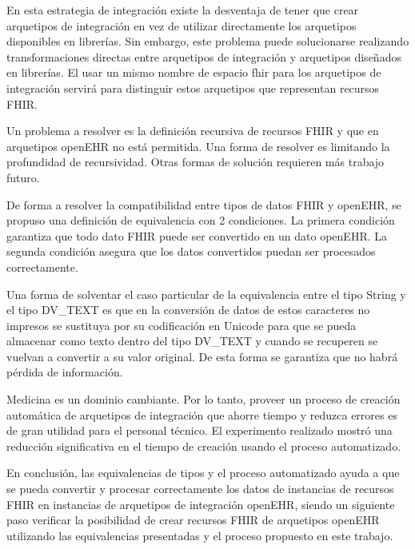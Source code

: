 En esta estrategia de integración existe la desventaja de tener que crear arquetipos de integración en vez de utilizar directamente los arquetipos disponibles en librerías. Sin embargo, este problema puede solucionarse realizando transformaciones directas entre arquetipos de integración y arquetipos diseñados en librerías. El usar un mismo nombre de espacio fhir para los arquetipos de integración servirá para distinguir estos arquetipos que representan recursos FHIR.

Un problema a resolver es la definición recursiva de recursos FHIR y que en arquetipos openEHR no está permitida. Una forma de resolver es limitando la profundidad de recursividad. Otras formas de solución requieren más trabajo futuro.

De forma a resolver la compatibilidad entre tipos de datos FHIR y openEHR, se propuso una definición de equivalencia con 2 condiciones. La primera condición garantiza que todo dato FHIR puede ser convertido en un dato openEHR. La segunda condición asegura que los datos convertidos puedan ser procesados correctamente.

Una forma de solventar el caso particular de la equivalencia entre el tipo String y el tipo DV\_TEXT es que en la conversión de datos de estos caracteres no impresos se sustituya por su codificación en Unicode para que se pueda almacenar como texto dentro del tipo DV\_TEXT y cuando se recuperen se vuelvan a convertir a su valor original. De esta forma se garantiza que no habrá pérdida de información.

Medicina es un dominio cambiante. Por lo tanto, proveer un proceso de creación automática de arquetipos de integración que ahorre tiempo y reduzca errores es de gran utilidad para el personal técnico. El experimento realizado mostró una reducción significativa en el tiempo de creación usando el proceso automatizado.

En conclusión, las equivalencias de tipos y el proceso automatizado ayuda a que se pueda convertir y procesar correctamente los datos de instancias de recursos FHIR en instancias de arquetipos de integración openEHR, siendo un siguiente paso verificar la posibilidad de crear recursos FHIR de arquetipos openEHR utilizando las equivalencias presentadas y el proceso propuesto en este trabajo.
